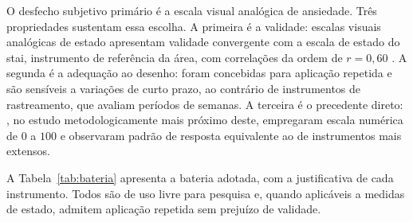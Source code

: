 O desfecho subjetivo primário é a escala visual analógica de ansiedade. Três propriedades sustentam essa escolha. A primeira é a validade: escalas visuais analógicas de estado apresentam validade convergente com a escala de estado do \gls{stai}, instrumento de referência da área, com correlações da ordem de $r = 0{,}60$ \citep{Facco2011}. A segunda é a adequação ao desenho: foram concebidas para aplicação repetida e são sensíveis a variações de curto prazo, ao contrário de instrumentos de rastreamento, que avaliam períodos de semanas. A terceira é o precedente direto: \citet{Kim2021}, no estudo metodologicamente mais próximo deste, empregaram escala numérica de $0$ a $100$ e observaram padrão de resposta equivalente ao de instrumentos mais extensos.

A Tabela~\ref{tab:bateria} apresenta a bateria adotada, com a justificativa de cada instrumento. Todos são de uso livre para pesquisa e, quando aplicáveis a medidas de estado, admitem aplicação repetida sem prejuízo de validade.

